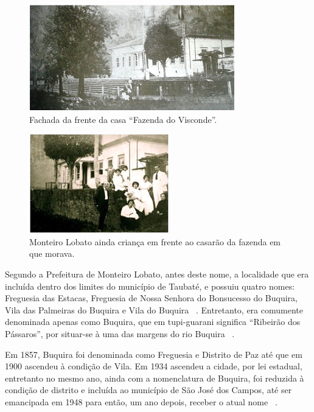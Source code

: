 \begin{figure}[h!]
	\centering
	\includegraphics[width=0.8\linewidth]{produtos/proddois/image18}
	\caption{Fachada da frente da casa “Fazenda do Visconde”.}
	\label{fig:image18}
\end{figure}

\begin{figure}[h!]
	\centering
	\includegraphics[width=0.8\linewidth]{produtos/proddois/image19}
	\caption{Monteiro Lobato ainda criança em frente ao casarão da fazenda em que morava.}
	\label{fig:image19}
\end{figure}

Segundo a Prefeitura de Monteiro Lobato, antes deste nome, a localidade que era incluída dentro dos limites do município de Taubaté, e possuiu quatro nomes: Freguesia das Estacas, Freguesia de Nossa Senhora do Bonsucesso do Buquira, Vila das Palmeiras do Buquira e Vila do Buquira ~\cite{MonteiroLobatoSite}. Entretanto, era comumente denominada apenas como Buquira, que em tupi-guarani significa “Ribeirão dos Pássaros”, por situar-se à uma das margens do rio Buquira ~\cite{IBGE2010}.

Em 1857, Buquira foi denominada como Freguesia e Distrito de Paz até que em 1900 ascendeu à condição de Vila. Em 1934 ascendeu a cidade, por lei estadual, entretanto no mesmo ano, ainda com a nomenclatura de Buquira, foi reduzida à condição de distrito e incluída ao município de São José dos Campos, até ser emancipada em 1948 para então, um ano depois, receber o atual nome ~\cite{MonteiroLobatoSite}.

